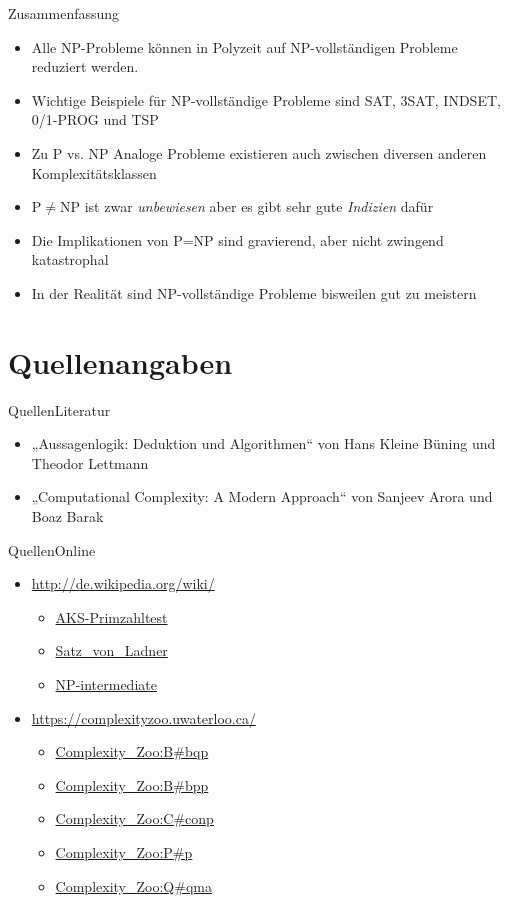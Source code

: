 \documentclass[ignorenonframetext,]{beamer}
\begin{document}
\begin{frame}{Zusammenfassung}

\begin{itemize}
\itemsep1pt\parskip0pt
\item
  Alle NP-Probleme können in Polyzeit auf NP-vollständigen Probleme
  reduziert werden.
\item
  Wichtige Beispiele für NP-vollständige Probleme sind SAT, 3SAT,
  INDSET, 0/1-PROG und TSP
\item
	Zu P vs. NP Analoge Probleme existieren auch zwischen diversen anderen Komplexitätsklassen
\item
  P$\neq$NP ist zwar \emph{unbewiesen} aber es gibt sehr gute
  \emph{Indizien} dafür
\item
  Die Implikationen von P=NP sind gravierend, aber nicht zwingend
  katastrophal
\item
  In der Realität sind NP-vollständige Probleme bisweilen gut zu
  meistern
\end{itemize}

\end{frame}

\section{Quellenangaben}\label{quellenangaben}

\begin{frame}{Quellen}{Literatur}
\begin{itemize}
	\item „Aussagenlogik: Deduktion und Algorithmen“ von Hans Kleine Büning und Theodor Lettmann
	\item „Computational Complexity: A Modern Approach“ von Sanjeev Arora und Boaz Barak
\end{itemize}
\end{frame}

\begin{frame}{Quellen}{Online}

\begin{itemize}
	\item \url{http://de.wikipedia.org/wiki/}
		\begin{itemize}
			\item \url{AKS-Primzahltest}
			\item \url{Satz\_von\_Ladner}
			\item \url{NP-intermediate}
		\end{itemize}
	\item \url{https://complexityzoo.uwaterloo.ca/}
		\begin{itemize}
			\item \url{Complexity\_Zoo:B\#bqp}
			\item \url{Complexity\_Zoo:B\#bpp}
			\item \url{Complexity\_Zoo:C\#conp}
			\item \url{Complexity\_Zoo:P\#p}
			\item \url{Complexity\_Zoo:Q\#qma}
		\end{itemize}
\end{itemize}
\end{frame}
\end{document}
